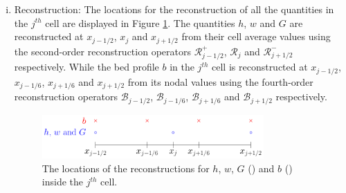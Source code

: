 \begin{enumerate}[(i)]
	\item Reconstruction: The locations for the reconstruction of all the quantities in the $j^{th}$ cell are displayed in Figure \ref{fig:ReconLocs}. The quantities $h$, $w$ and $G$ are reconstructed at $x_{j-1/2}$, $x_{j}$ and $x_{j+1/2}$ from their cell average values using the second-order reconstruction operators $\mathcal{R}^+_{j-1/2}$, $\mathcal{R}_{j}$ and $\mathcal{R}^-_{j+1/2}$ respectively. While the bed profile $b$ in the $j^{th}$ cell is reconstructed at $x_{j-1/2}$, $x_{j-1/6}$, $x_{j+1/6}$ and $x_{j+1/2}$ from its nodal values using the fourth-order reconstruction operators $\mathcal{B}_{j-1/2}$, $\mathcal{B}_{j-1/6}$, $\mathcal{B}_{j+1/6}$ and $\mathcal{B}_{j+1/2}$ respectively. 
	\begin{figure}
		\centering
		\includegraphics[width=0.8\textwidth]{./chp3/figures/FEVMRecon.pdf}
		\caption{The locations of the reconstructions for $h$, $w$, $G$ () and $b$ () inside the $j^{th}$ cell.}
		\label{fig:ReconLocs}
	\end{figure}
	

\end{enumerate}
